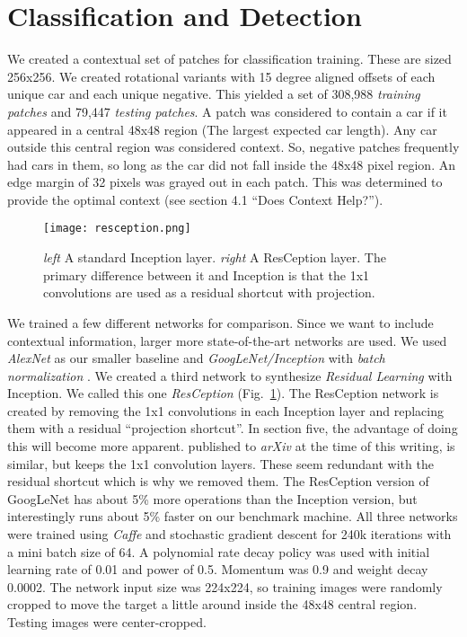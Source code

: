 \documentclass[runningheads]{llncs}
\begin{document}
\section{Classification and Detection}
We created a contextual set of patches for classification training. These are sized 256x256. We created rotational variants with 15 degree aligned offsets of each unique car and each unique negative. This yielded a set of 308,988 {\it training patches} and 79,447 {\it testing patches}. A patch was considered to contain a car if it appeared in a central 48x48 region (The largest expected car length). Any car outside this central region was considered context. So, negative patches frequently had cars in them, so long as the car did not fall inside the 48x48 pixel region. An edge margin of 32 pixels was grayed out in each patch. This was determined to provide the optimal context (see section 4.1 ``Does Context Help?''). 

\begin{figure}
\centering
\texttt{[image: resception.png]}
\caption{{\it left} A standard Inception layer. {\it right} A ResCeption layer. The primary difference between it and Inception is that the 1x1 convolutions are used as a residual shortcut with projection. }
\label{fig:resception}
\end{figure}

We trained a few different networks for comparison. Since we want to include contextual information, larger more state-of-the-art networks are used. We used {\it AlexNet} \cite{AlexNet} as our smaller baseline and {\it GoogLeNet/Inception} with {\it batch normalization} \cite{GoogLeNet,BatchNorm}. We created a third network to synthesize {\it Residual Learning} \cite{ResNet} with Inception. We called this one {\it ResCeption}  (Fig.~\ref{fig:resception}). The ResCeption network is created by removing the 1x1 convolutions in each Inception layer and replacing them with a residual ``projection shortcut''. In section five, the advantage of doing this will become more apparent. \cite{Inceptionv4} published to {\it arXiv} at the time of this writing, is similar, but keeps the 1x1 convolution layers. These seem redundant with the residual shortcut which is why we removed them. The ResCeption version of GoogLeNet has about 5\% more operations than the Inception version, but interestingly runs about 5\% faster on our benchmark machine. All three networks were trained using {\it Caffe} \cite{Caffe} and stochastic gradient descent for 240k iterations with a mini batch size of 64. A polynomial rate decay policy was used with initial learning rate of 0.01 and power of 0.5. Momentum was 0.9 and weight decay 0.0002. The network input size was 224x224, so training images were randomly cropped to move the target a little around inside the 48x48 central region. Testing images were center-cropped. 
\end{document}
